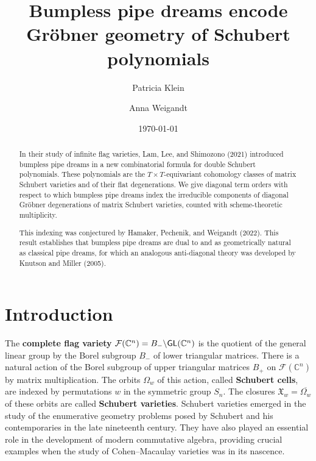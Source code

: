 \documentclass[12pt,reqno]{amsart}
\newtheorem{Main Conjecture}[theorem]{Main Conjecture}
\theoremstyle{remark}
\theoremstyle{plain}
\newcommand{\mydef}[1]{{\bf #1}}
\newcommand{\CC}{\mathbb{C}}
\newcommand{\fl}{{\mathcal F}}
\newcommand{\GL}{{\sf GL}}
\begin{document}
\pagestyle{plain}



\title{Bumpless pipe dreams encode Gr\"obner geometry of Schubert polynomials}
\author{Patricia Klein}
\address{Department of Mathematics, Texas A\&M University, College Station, TX 77840, USA}

\author{Anna Weigandt}
\address{School of Mathematics, University of Minnesota, Minneapolis, MN 55455, USA}

\date{\today}

\begin{abstract}
In their study of infinite flag varieties, Lam, Lee, and Shimozono (2021) introduced bumpless pipe dreams in a new combinatorial formula for double Schubert polynomials.  These polynomials are the $T \times T$-equivariant cohomology classes of matrix Schubert varieties and of their flat degenerations.  We give diagonal term orders with respect to which bumpless pipe dreams index the irreducible components of diagonal Gr\"obner degenerations of matrix Schubert varieties, counted with scheme-theoretic multiplicity.  

This indexing was conjectured by Hamaker, Pechenik, and Weigandt (2022).  This result establishes that bumpless pipe dreams are dual to and as geometrically natural as classical pipe dreams, for which an analogous anti-diagonal theory was developed by Knutson and Miller (2005).
\end{abstract}


\maketitle


\tableofcontents

\section{Introduction}

The \mydef{complete flag variety} $\fl(\CC^n)=B_-\backslash\GL(\CC^n)$ is the quotient of the general linear group by the Borel subgroup $B_-$ of lower triangular matrices.  There is a natural action of the Borel subgroup of upper triangular matrices $B_+$ on $\fl(\CC^n)$ by matrix multiplication.  The orbits $\Omega_w$ of this action, called \mydef{Schubert cells}, are indexed by permutations $w$ in the symmetric group $S_n$.  The closures $\mathfrak X_w=\overline{\Omega_w}$ of these orbits are called \mydef{Schubert varieties}.  Schubert varieties emerged in the study of the enumerative geometry problems posed by Schubert \cite{Sch79} and his contemporaries in the late nineteenth century. They have also played an essential role in the development of modern commutative algebra, providing crucial examples when the study of Cohen--Macaulay varieties was in its nascence.
\end{document}
